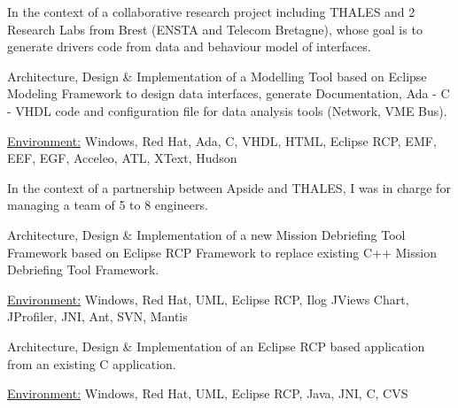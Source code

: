 \documentclass[10pt,letterpaper]{resume/resume}
\begin{document}
\begin{minipage}[t]{\linewidth}

\par In the context of a collaborative research project including THALES and 2 Research Labs from Brest (ENSTA and Telecom Bretagne), whose goal is to generate drivers code from data and behaviour model of interfaces.
\par Architecture, Design \& Implementation of a Modelling Tool based on Eclipse Modeling Framework to design data interfaces, generate Documentation, Ada - C - VHDL code and configuration file for data analysis tools (Network, VME Bus).
\par\underline{Environment:} Windows, Red Hat, Ada, C, VHDL, HTML, Eclipse RCP, EMF, EEF, EGF, Acceleo, ATL, XText, Hudson

\par In the context of a partnership between Apside and THALES, I was in charge for managing a team of 5 to 8 engineers.
\par Architecture, Design \& Implementation of a new Mission Debriefing Tool Framework based on Eclipse RCP Framework to replace existing C++ Mission Debriefing Tool Framework.
\par\underline{Environment:} Windows, Red Hat, UML, Eclipse RCP, Ilog JViews Chart, JProfiler, JNI, Ant, SVN, Mantis
%

\par Architecture, Design \& Implementation of an Eclipse RCP based application from an existing C application.
\par\underline{Environment:} Windows, Red Hat, UML, Eclipse RCP, Java, JNI, C, CVS


\end{minipage}
\end{document}
